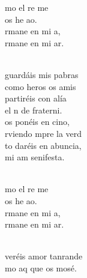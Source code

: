 \documentclass[12pt]{article}
\begin{document}
\begin{multicols*}{2}
        \begin{cancion}[Amaos][Kairoi]%
            \begin{chorus}%
            mo el re me  \\
             os he ao.\\
            rmane en mi a,\\
            rmane en mi ar.\\
            \end{chorus}%
            \jump\\
            guardáis mis pabras\\
            como heros os amis\\
            partiréis con alía\\
            el n de fraterni.\\
        \jump
            os ponéis en cino,\\
            rviendo mpre la verd\\
            to daréis en abuncia,\\
            mi am senifesta.\\\jump\\
            \begin{chorus}%
            mo el re me  \\
             os he ao.\\
            rmane en mi a,\\
            rmane en mi ar.\\
            \end{chorus}%
            \jump\\
            veréis amor tanrande\\
            mo aq que os mosé.\\

\end{cancion}
\end{multicols*}
\end{document}
